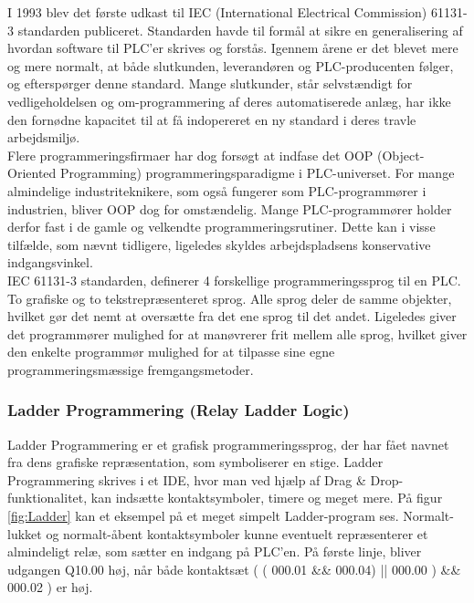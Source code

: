 I 1993 blev det første udkast til IEC (International Electrical Commission) 61131-3 standarden publiceret\cite{iecStandard}. Standarden havde til formål at sikre en generalisering af hvordan software til PLC'er skrives og forstås. Igennem årene er det blevet mere og mere normalt, at både slutkunden, leverandøren og PLC-producenten følger, og efterspørger denne standard. Mange slutkunder, står selvstændigt for vedligeholdelsen og om-programmering af deres automatiserede anlæg, har ikke den fornødne kapacitet til at få indopereret en ny standard i deres travle arbejdsmiljø. \\

\noindent Flere programmeringsfirmaer har dog forsøgt at indfase det OOP (Object-Oriented Programming) programmeringsparadigme i PLC-universet. For mange almindelige industriteknikere, som også fungerer som PLC-programmører i industrien, bliver OOP dog for omstændelig. Mange PLC-programmører holder derfor fast i de gamle og velkendte programmeringsrutiner. Dette kan i visse tilfælde, som nævnt tidligere, ligeledes skyldes arbejdspladsens konservative indgangsvinkel. \cite{PLC_Siemens_OOP} \\

\noindent IEC 61131-3 standarden, definerer 4 forskellige programmeringssprog til en PLC. To grafiske og to tekstrepræsenteret sprog. Alle sprog deler de samme objekter, hvilket gør det nemt at oversætte fra det ene sprog til det andet. Ligeledes giver det programmører mulighed for at manøvrerer frit mellem alle sprog, hvilket giver den enkelte programmør mulighed for at tilpasse sine egne programmeringsmæssige fremgangsmetoder. 


\subsubsection{Ladder Programmering (Relay Ladder Logic)}
Ladder Programmering er et grafisk programmeringssprog, der har fået navnet fra dens grafiske repræsentation, som symboliserer en stige. Ladder Programmering skrives i et IDE, hvor man ved hjælp af Drag \& Drop-funktionalitet, kan indsætte kontaktsymboler, timere og meget mere. På figur \ref{fig:Ladder} kan et eksempel på et meget simpelt Ladder-program ses. Normalt-lukket og normalt-åbent kontaktsymboler kunne eventuelt repræsenterer et almindeligt relæ, som sætter en indgang på PLC'en. På første linje, bliver udgangen Q10.00 høj, når både kontaktsæt ( ( 000.01 \&\& 000.04) || 000.00 ) \&\& 000.02 ) er høj.

